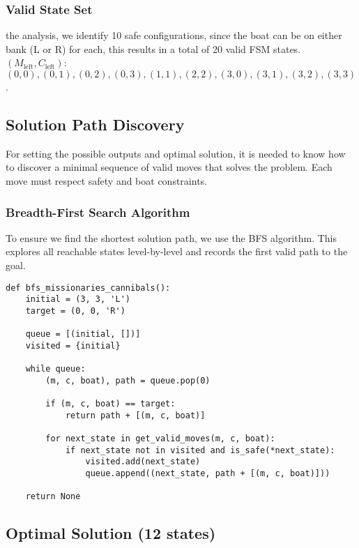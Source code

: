 \documentclass[10pt,a4paper]{article}
\begin{document}
\subsubsection*{Valid State Set}

\noindentFrom the analysis, we identify 10 safe configurations, since the boat can be on either bank (L or R) for each, this results in a total of 20 valid FSM states.\\

\noindent\((M_\text{left}, C_\text{left})\): 
\((0,0), (0,1), (0,2), (0,3), (1,1), (2,2), (3,0), (3,1), (3,2), (3,3)\). 


\subsection*{Solution Path Discovery}

For setting the possible outputs and optimal solution, it is needed to know how to discover a minimal sequence of valid moves that solves the problem. Each move must respect safety and boat constraints.

\subsubsection*{Breadth-First Search Algorithm}

To ensure we find the shortest solution path, we use the BFS algorithm. This explores all reachable states level-by-level and records the first valid path to the goal.

\begin{verbatim}
def bfs_missionaries_cannibals():
    initial = (3, 3, 'L')
    target = (0, 0, 'R')
    
    queue = [(initial, [])]
    visited = {initial}
    
    while queue:
        (m, c, boat), path = queue.pop(0)
        
        if (m, c, boat) == target:
            return path + [(m, c, boat)]
        
        for next_state in get_valid_moves(m, c, boat):
            if next_state not in visited and is_safe(*next_state):
                visited.add(next_state)
                queue.append((next_state, path + [(m, c, boat)]))
    
    return None
\end{verbatim}

\subsection*{Optimal Solution (12 states)}
\end{document}
